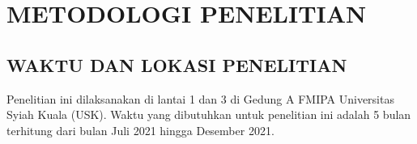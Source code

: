 \fancyhf{}
\fancyfoot[C]{\thepage}
\chapter{METODOLOGI PENELITIAN}

\section{\uppercase{WAKTU DAN LOKASI PENELITIAN}}
\setlength\parindent{30pt} Penelitian ini dilaksanakan di lantai 1 dan 3 di Gedung A FMIPA Universitas Syiah Kuala (USK). Waktu yang dibutuhkan untuk penelitian ini adalah 5 bulan terhitung dari bulan Juli 2021 hingga Desember 2021.

